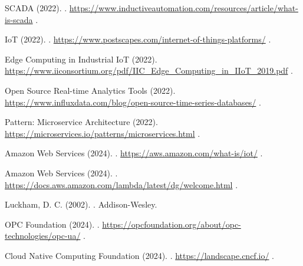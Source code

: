 \begin{thebibliography}{99}
    SCADA (2022).
    .
    \newblock \url{https://www.inductiveautomation.com/resources/article/what-is-scada}
    \newblock [Accessed: 01/04/2025].

    IoT (2022).
    .
    \newblock \url{https://www.postscapes.com/internet-of-things-platforms/}
    \newblock [Accessed: 01/04/2025].

    Edge Computing in Industrial IoT (2022).
    \newblock \url{https://www.iiconsortium.org/pdf/IIC_Edge_Computing_in_IIoT_2019.pdf}
    \newblock [Accessed: 01/04/2025].

    Open Source Real-time Analytics Tools (2022).
    \newblock \url{https://www.influxdata.com/blog/open-source-time-series-databases/}
    \newblock [Accessed: 01/04/2025].

    {Pattern: Microservice Architecture} (2022).
    \newblock \url{https://microservices.io/patterns/microservices.html}
    \newblock [Accessed: 27/12/2022].

    Amazon Web Services (2024).
    .
    \newblock \url{https://aws.amazon.com/what-is/iot/}
    \newblock [Accessed: 01/04/2025].

    Amazon Web Services (2024).
    .
    \newblock \url{https://docs.aws.amazon.com/lambda/latest/dg/welcome.html}
    \newblock [Accessed: 01/04/2025].

    Luckham, D. C. (2002).
    .
    \newblock Addison-Wesley.

    OPC Foundation (2024).
    .
    \newblock \url{https://opcfoundation.org/about/opc-technologies/opc-ua/}
    \newblock [Accessed: 01/04/2025].

    Cloud Native Computing Foundation (2024).
    .
    \newblock \url{https://landscape.cncf.io/}
    \newblock [Accessed: 01/04/2025].


\end{thebibliography}
